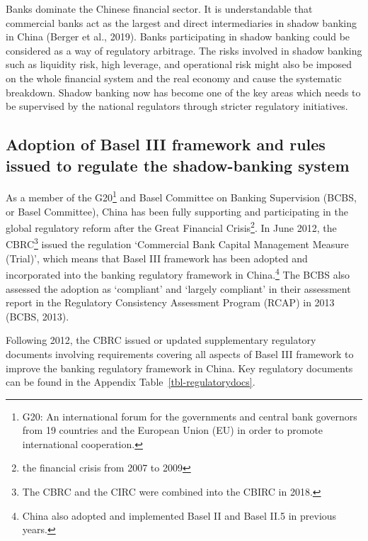 \documentclass[
  letterpaper,
  DIV=11,
  numbers=noendperiod]{scrreprt}
\begin{document}
Banks dominate the Chinese financial sector. It is understandable that
commercial banks act as the largest and direct intermediaries in shadow
banking in China (Berger et al., 2019). Banks participating in shadow
banking could be considered as a way of regulatory arbitrage. The risks
involved in shadow banking such as liquidity risk, high leverage, and
operational risk might also be imposed on the whole financial system and
the real economy and cause the systematic breakdown. Shadow banking now
has become one of the key areas which needs to be supervised by the
national regulators through stricter regulatory initiatives.

\subsection{Adoption of Basel III framework and rules issued to regulate
the shadow-banking
system}\label{adoption-of-basel-iii-framework-and-rules-issued-to-regulate-the-shadow-banking-system}

As a member of the G20\footnote{G20: An international forum for the
  governments and central bank governors from 19 countries and the
  European Union (EU) in order to promote international cooperation.}
and Basel Committee on Banking Supervision (BCBS, or Basel Committee),
China has been fully supporting and participating in the global
regulatory reform after the Great Financial Crisis\footnote{the
  financial crisis from 2007 to 2009}. In June 2012, the CBRC\footnote{The
  CBRC and the CIRC were combined into the CBIRC in 2018.} issued the
regulation `Commercial Bank Capital Management Measure (Trial)', which
means that Basel III framework has been adopted and incorporated into
the banking regulatory framework in China.\footnote{China also adopted
  and implemented Basel II and Basel II.5 in previous years.} The BCBS
also assessed the adoption as `compliant' and `largely compliant' in
their assessment report in the Regulatory Consistency Assessment Program
(RCAP) in 2013 (BCBS, 2013).

Following 2012, the CBRC issued or updated supplementary regulatory
documents involving requirements covering all aspects of Basel III
framework to improve the banking regulatory framework in China. Key
regulatory documents can be found in the Appendix
Table~\ref{tbl-regulatorydocs}.
\end{document}
